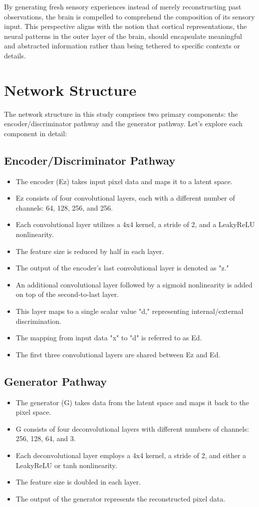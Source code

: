 \documentclass{midl} %
\begin{document}
By generating fresh sensory experiences instead of merely reconstructing past observations, the brain is compelled to comprehend the composition of its sensory input. This perspective aligns with the notion that cortical representations, the neural patterns in the outer layer of the brain, should encapsulate meaningful and abstracted information rather than being tethered to specific contexts or details.


\section{Network Structure}

The network structure in this study comprises two primary components: the encoder/discriminator pathway and the generator pathway. Let's explore each component in detail:

\subsection{Encoder/Discriminator Pathway}
\begin{itemize}
  \item The encoder (Ez) takes input pixel data and maps it to a latent space.
  \item Ez consists of four convolutional layers, each with a different number of channels: 64, 128, 256, and 256.
  \item Each convolutional layer utilizes a 4x4 kernel, a stride of 2, and a LeakyReLU nonlinearity.
  \item The feature size is reduced by half in each layer.
  \item The output of the encoder's last convolutional layer is denoted as "z."
  \item An additional convolutional layer followed by a sigmoid nonlinearity is added on top of the second-to-last layer.
  \item This layer maps to a single scalar value "d," representing internal/external discrimination.
  \item The mapping from input data "x" to "d" is referred to as Ed.
  \item The first three convolutional layers are shared between Ez and Ed.
\end{itemize}

\subsection{Generator Pathway}
\begin{itemize}
  \item The generator (G) takes data from the latent space and maps it back to the pixel space.
  \item G consists of four deconvolutional layers with different numbers of channels: 256, 128, 64, and 3.
  \item Each deconvolutional layer employs a 4x4 kernel, a stride of 2, and either a LeakyReLU or tanh nonlinearity.
  \item The feature size is doubled in each layer.
  \item The output of the generator represents the reconstructed pixel data.
\end{itemize}
\end{document}
